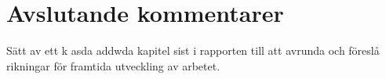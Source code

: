 \chapter{Avslutande kommentarer}\label{cha:conclusions}
%
Sätt av ett k asda  addwda kapitel sist i rapporten till att avrunda och föreslå rikningar för framtida utveckling av arbetet.